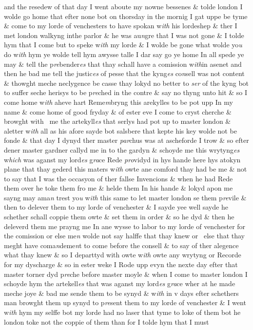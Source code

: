 \documentclass[12pt, a4paper]{book}
\begin{document}
		\ifthenelse{\isodd{\thepage}}
		{\reversemarginpar}
		{\normalmarginpar}
		and the resedew of that day I went aboute my nowne bessenes \&
	tolde london I wolde go home that efter none bot on thorsday in the
	mornig I gat uppe be tyme \& come to my lorde of venchesters
 to have spokan w\textit{ith} his lordeshep \& ther I met london walkyng inthe
 parlor \& he was au\textit{n}gre that I was not gone \& I tolde hym that I come but
 to speke w\textit{ith} my lorde \& I wolde be gone what wolde yo\textit{u} do w\textit{ith} hym ye
 wolde tell hym awysse talle I dar say go ye home In all spede ye may
 \& tell the p\textit{re}bender\textit{es} that thay schall have a comission w\textit{ith}in asenet
 and then he bad me tell the justic\textit{es} of pesse that the kyng\textit{es} co\textit{n}sell
 was not content \& thowght meche neclygence be casse thay lokyd
 no better to \textit{ser} of the kyng bot to suffer seche herisys to be p\textit{re}ched in
 the contre \& say no thyng unto hit \& so I come home w\textit{ith} aheve
 hart Reme\textit{m}bryng this arekylles to be pot upp In my name \& come
 home of good fryday \& of ester eve I come to cryst cherche \&
 browght with  me the artekyll\textit{es} that serlys had pot up to master london
 \& aletter w\textit{ith} all as his afore sayde bot salsbere that kepte his
	key wolde not be fonde \& that day I dynyd ther master \textit{par}chus was
 at ascheforde I trow \& so efter dener master gardner callyd me in
	to the gardyn \& schoyde me this wrytyng\textit{es} w\textit{hich} was aganst my
 lord\textit{es} g\textit{ra}ce Rede \textit{pro}vidyd in hys hande here hys atokyn plane
 that thay gederd this maters w\textit{ith} owte ane comford thay had
 be me \& not to say that I was the occasyon of ther fallse
 Invencions \& when he had Rede them over he toke them fro
 me \& helde them In his hande \& lokyd apon me sayng may ama\textit{n}
	trest yo\textit{u} w\textit{ith} this same to let master london se them p\textit{re}vile \&
	then to delever them to my lorde of venchester \& I sayde yee
	well sayde he schether schall coppie them owte \& set them
 in order \& so he dyd \& then he deleverd them me prayng
 me In ane wysse to labor to my lorde of venchester for the
 comission or else me\textit{n} wolde not say halffe that thay knew or 
 else that thay meght have coma\textit{n}deme\textit{n}t to come before
 the consell \& to say of ther alegence what thay knew \&
 so I departtyd with owte w\textit{ith} owte any wrytyng or Recorde
 for my dyscharge \& so in ester weke I Rode upp evyn the nexte
 day efter that master torner dyd p\textit{re}che before master moyle
	\& when I come to master london I schoyde hym the artekell\textit{es} that
	was aganst my lord\textit{es} g\textit{ra}ce wher at he made meche joye \& bad me
	sende them to be synyd \& w\textit{ith} in v days efter schethers man browght
	them up synyd to p\textit{re}sent them to my lorde of venchester \& I went
 w\textit{ith} hym my selffe bot my lorde had no laser that tyme to loke of
	them bot he london
			 toke not the coppie of them than for I tolde hym that I must
 	
\end{document}
